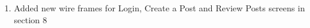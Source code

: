 \begin{enumerate}
    \item Added new wire frames for Login, Create a Post and Review Posts screens in section 8
\end{enumerate}
